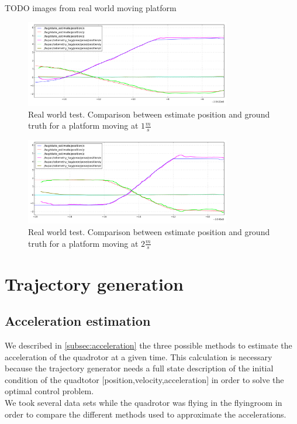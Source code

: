 TODO images from real world moving platform
\begin{figure}[!ht]
    \centering
    \includegraphics[width=0.8\textwidth]{img/position_real_world.png}
    \caption{Real world test. Comparison between estimate position and ground truth for a platform moving at $1\frac{m}{s}$}
    \label{fig:ekf_position_real}
\end{figure}

\begin{figure}[!ht]
    \centering
    \includegraphics[width=0.8\textwidth]{img/position_real_world_fast.png}
      \caption{Real world test. Comparison between estimate position and ground truth for a platform moving at $2\frac{m}{s}$}
    \label{fig:ekf_position_real_fast}
\end{figure}

\newpage

\section{Trajectory generation}

\subsection{Acceleration estimation} \label{subsec:acceleration_experiments}
We described in \ref{subsec:acceleration} the three possible methods to estimate the acceleration of the quadrotor at a given time. This calculation is necessary because the trajectory generator needs a full state description of the initial condition of the quadtotor [position,velocity,acceleration] in order to solve the optimal control problem.\\
We took several data sets while the quadrotor was flying in the flyingroom in order to compare the different methods used to approximate the accelerations.\\

